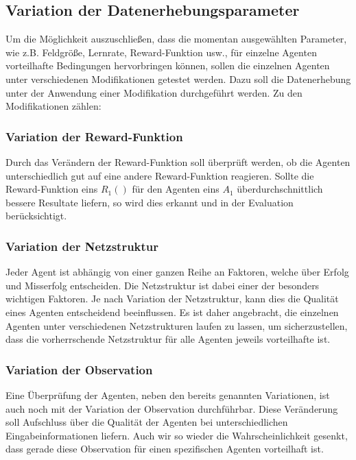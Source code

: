 \subsection{Variation der Datenerhebungsparameter}
Um die Möglichkeit auszuschließen, dass die momentan ausgewählten Parameter, wie z.B. Feldgröße, Lernrate, Reward-Funktion usw., für einzelne Agenten vorteilhafte Bedingungen hervorbringen können, sollen die einzelnen Agenten unter verschiedenen Modifikationen getestet werden. Dazu soll die Datenerhebung unter der Anwendung einer Modifikation durchgeführt werden. Zu den Modifikationen zählen:

\subsubsection{Variation der Reward-Funktion}
Durch das Verändern der Reward-Funktion soll überprüft werden, ob die Agenten unterschiedlich gut auf eine andere Reward-Funktion reagieren. Sollte die Reward-Funktion eins $R_{1}()$ für den Agenten eins $A_{1}$ überdurchschnittlich bessere Resultate liefern, so wird dies erkannt und in der Evaluation berücksichtigt.

\subsubsection{Variation der Netzstruktur}
Jeder Agent ist abhängig von einer ganzen Reihe an Faktoren, welche über Erfolg und Misserfolg entscheiden. Die Netzstruktur ist dabei einer der besonders wichtigen Faktoren. Je nach Variation der Netzstruktur, kann dies die Qualität eines Agenten entscheidend beeinflussen. Es ist daher angebracht, die einzelnen Agenten unter verschiedenen Netzstrukturen laufen zu lassen, um sicherzustellen, dass die vorherrschende Netzstruktur  für alle Agenten jeweils vorteilhafte ist.

\subsubsection{Variation der Observation}
Eine Überprüfung der Agenten, neben den bereits genannten Variationen, ist auch noch mit der Variation der Observation durchführbar. Diese Veränderung soll Aufschluss über die Qualität der Agenten bei unterschiedlichen Eingabeinformationen liefern. Auch wir so wieder die Wahrscheinlichkeit gesenkt, dass gerade diese Observation für einen spezifischen Agenten vorteilhaft ist.

